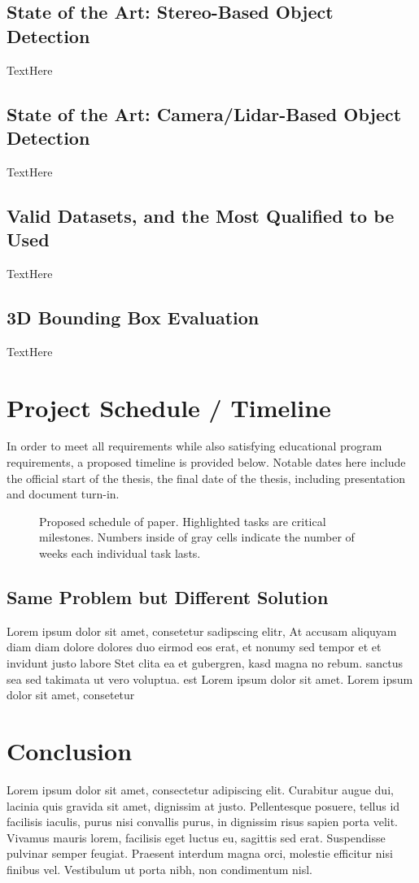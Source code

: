 \subsection{State of the Art: Stereo-Based Object Detection}
TextHere

\subsection{State of the Art: Camera/Lidar-Based Object Detection}
TextHere

\subsection{Valid Datasets, and the Most Qualified to be Used}
TextHere

\subsection{3D Bounding Box Evaluation}
TextHere

\section{Project Schedule / Timeline}
In order to meet all requirements while also satisfying educational program requirements, a proposed timeline is provided below. Notable dates here include the official start of the thesis, the final date of the thesis, including presentation and document turn-in. 

\begin{figure}[h] %
    \caption{Proposed schedule of paper. Highlighted tasks are critical milestones. Numbers inside of gray cells indicate the number of weeks each individual task lasts.}
\end{figure}


\subsection{Same Problem but Different Solution}
Lorem ipsum dolor sit amet, consetetur sadipscing elitr, At accusam aliquyam diam diam dolore dolores duo eirmod eos erat, et nonumy sed tempor et et invidunt justo labore Stet clita ea et gubergren, kasd magna no rebum. sanctus sea sed takimata ut vero voluptua. est Lorem ipsum dolor sit amet. Lorem ipsum dolor sit amet, consetetur\\
\section{Conclusion}
 Lorem ipsum dolor sit amet, consectetur adipiscing elit. Curabitur augue dui, lacinia quis gravida sit amet, dignissim at justo. Pellentesque posuere, tellus id facilisis iaculis, purus nisi convallis purus, in dignissim risus sapien porta velit. Vivamus mauris lorem, facilisis eget luctus eu, sagittis sed erat. Suspendisse pulvinar semper feugiat. Praesent interdum magna orci, molestie efficitur nisi finibus vel. Vestibulum ut porta nibh, non condimentum nisl. 
